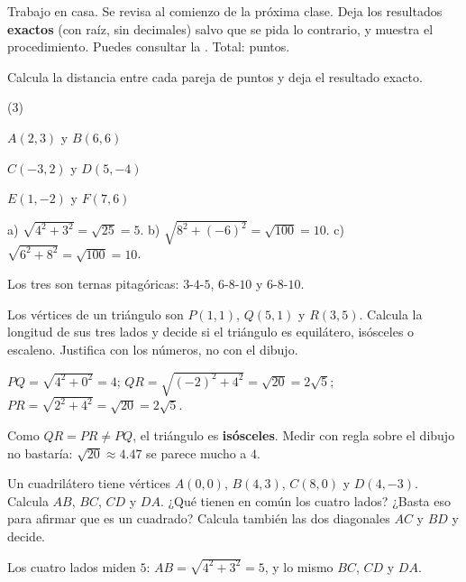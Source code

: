\documentclass[11pt]{article}
\begin{document}
\encabezado

\begin{instrucciones}
Trabajo en casa. Se revisa al comienzo de la próxima clase. Deja los resultados
\textbf{exactos} (con raíz, sin decimales) salvo que se pida lo contrario, y muestra el
procedimiento. Puedes consultar la .
Total: \totalpuntos{} puntos.
\end{instrucciones}

\begin{preguntas}

\pregunta[1] Calcula la distancia entre cada pareja de puntos y deja el resultado exacto.
\begin{opciones*}(3)
  \item $A(2, 3)$ y $B(6, 6)$
  \item $C(-3, 2)$ y $D(5, -4)$
  \item $E(1, -2)$ y $F(7, 6)$
\end{opciones*}
\begin{solucion}[4cm]
a) $\sqrt{4^2 + 3^2} = \sqrt{25} = 5$. \quad b) $\sqrt{8^2 + (-6)^2} = \sqrt{100} = 10$. \quad
c) $\sqrt{6^2 + 8^2} = \sqrt{100} = 10$.

Los tres son ternas pitagóricas: $3$-$4$-$5$, $6$-$8$-$10$ y $6$-$8$-$10$.
\end{solucion}

\pregunta[1.5] Los vértices de un triángulo son $P(1, 1)$, $Q(5, 1)$ y $R(3, 5)$. Calcula la
longitud de sus tres lados y decide si el triángulo es equilátero, isósceles o escaleno.
Justifica con los números, no con el dibujo.
\begin{solucion}[4.5cm]
$PQ = \sqrt{4^2 + 0^2} = 4$; \quad $QR = \sqrt{(-2)^2 + 4^2} = \sqrt{20} = 2\sqrt{5}$; \quad
$PR = \sqrt{2^2 + 4^2} = \sqrt{20} = 2\sqrt{5}$.

Como $QR = PR \neq PQ$, el triángulo es \textbf{isósceles}. Medir con regla sobre el dibujo no
bastaría: $\sqrt{20} \approx \num{4,47}$ se parece mucho a $4$.
\end{solucion}

\pregunta[1.5] Un cuadrilátero tiene vértices $A(0, 0)$, $B(4, 3)$, $C(8, 0)$ y $D(4, -3)$.
Calcula $AB$, $BC$, $CD$ y $DA$. ¿Qué tienen en común los cuatro lados? ¿Basta eso para
afirmar que es un cuadrado? Calcula también las dos diagonales $AC$ y $BD$ y decide.
\begin{solucion}[5cm]
Los cuatro lados miden $5$: $AB = \sqrt{4^2 + 3^2} = 5$, y lo mismo $BC$, $CD$ y $DA$.


\end{solucion}
\end{preguntas}
\end{document}
